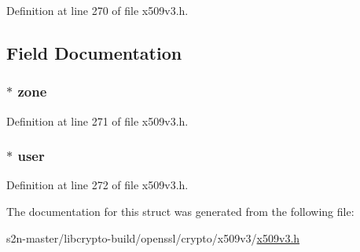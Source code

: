 Definition at line 270 of file x509v3.\+h.



\subsection{Field Documentation}
\subsubsection[{\texorpdfstring{zone}{zone}}]{ $\ast$ zone}\hypertarget{struct_s_x_n_e_t___i_d__st_a27f63fdf18e6ccb9491adcf718f33e0c}{}\label{struct_s_x_n_e_t___i_d__st_a27f63fdf18e6ccb9491adcf718f33e0c}


Definition at line 271 of file x509v3.\+h.

\subsubsection[{\texorpdfstring{user}{user}}]{ $\ast$ user}\hypertarget{struct_s_x_n_e_t___i_d__st_ad9d47f546cb406448dad26c528f77c3e}{}\label{struct_s_x_n_e_t___i_d__st_ad9d47f546cb406448dad26c528f77c3e}


Definition at line 272 of file x509v3.\+h.



The documentation for this struct was generated from the following file\+:\begin{DoxyCompactItemize}
\item 
s2n-\/master/libcrypto-\/build/openssl/crypto/x509v3/\hyperlink{crypto_2x509v3_2x509v3_8h}{x509v3.\+h}\end{DoxyCompactItemize}
